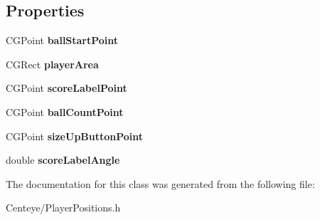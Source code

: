\subsection*{Properties}
\begin{DoxyCompactItemize}
\item 
\hypertarget{interface_player_positions_a4aa066ec1cd2887724af7d1123091174}{C\+G\+Point {\bfseries ball\+Start\+Point}}\label{interface_player_positions_a4aa066ec1cd2887724af7d1123091174}

\item 
\hypertarget{interface_player_positions_a816ba5499779e627f95465ee00676ca7}{C\+G\+Rect {\bfseries player\+Area}}\label{interface_player_positions_a816ba5499779e627f95465ee00676ca7}

\item 
\hypertarget{interface_player_positions_aa399c60c9f9cccf608d5473790c96c53}{C\+G\+Point {\bfseries score\+Label\+Point}}\label{interface_player_positions_aa399c60c9f9cccf608d5473790c96c53}

\item 
\hypertarget{interface_player_positions_a37de1ce3fe1539c58ccb1b8193d7d923}{C\+G\+Point {\bfseries ball\+Count\+Point}}\label{interface_player_positions_a37de1ce3fe1539c58ccb1b8193d7d923}

\item 
\hypertarget{interface_player_positions_a02518a6ca7cd3d669f75262530745be6}{C\+G\+Point {\bfseries size\+Up\+Button\+Point}}\label{interface_player_positions_a02518a6ca7cd3d669f75262530745be6}

\item 
\hypertarget{interface_player_positions_a26c381d8943947e24e03e9ee46037d8c}{double {\bfseries score\+Label\+Angle}}\label{interface_player_positions_a26c381d8943947e24e03e9ee46037d8c}

\end{DoxyCompactItemize}


The documentation for this class was generated from the following file\+:\begin{DoxyCompactItemize}
\item 
Centeye/Player\+Positions.\+h\end{DoxyCompactItemize}
